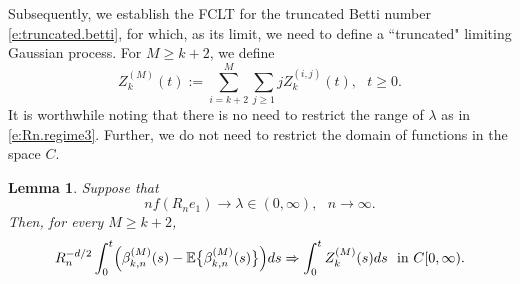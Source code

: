 \documentclass[11pt]{amsart}
\numberwithin{equation}{section}
\theoremstyle{plain}
\newtheorem{lemma}[theorem]{Lemma}
\theoremstyle{definition}
\begin{document}
Subsequently, we establish the FCLT for the truncated Betti number \eqref{e:truncated.betti}, for which, as its limit, we need to define a ``truncated" limiting Gaussian process. For $M \geq k+2$, we define
$$
Z_k^{(M)}(t) := \sum_{i=k+2}^M \sum_{j\geq1} j Z_k^{(i,j)}(t),  \ \ \ t\geq0.
$$
It is worthwhile noting that there is no need to restrict the range of $\lambda$ as in \eqref{e:Rn.regime3}. Further, we do not need to restrict the domain of functions in the space $C$.
\begin{lemma}  \label{l:giant.truncated.clt}
Suppose that
$$
nf(R_ne_1) \to \lambda \in (0,\infty), \ \ \ n\to\infty.
$$
Then, for every $M\geq k+2$,
$$
R_n^{-d/2} \int_0^t \Bigl( \beta_{k,n}^{(M)}(s) - {\mathbb{E}} \bigl\{ \beta_{k,n}^{(M)}(s) \bigr\} \Bigr)ds \Rightarrow \int_0^t Z_k^{(M)}(s)ds \ \ \text{in } C[0,\infty).
$$
\end{lemma}
\end{document}
